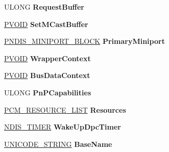 \begin{DoxyCompactItemize}
U\+L\+O\+NG {\bfseries Request\+Buffer}
\item 
\mbox{\label{struct___n_d_i_s___m_i_n_i_p_o_r_t___b_l_o_c_k_a7dcd0e1f355203dc4f05fac47b63d294}} 
\hyperlink{interfacevoid}{P\+V\+O\+ID} {\bfseries Set\+M\+Cast\+Buffer}
\item 
\mbox{\label{struct___n_d_i_s___m_i_n_i_p_o_r_t___b_l_o_c_k_a522afa69946a1b5e1d6725f5083ccd54}} 
\hyperlink{struct___n_d_i_s___m_i_n_i_p_o_r_t___b_l_o_c_k}{P\+N\+D\+I\+S\+\_\+\+M\+I\+N\+I\+P\+O\+R\+T\+\_\+\+B\+L\+O\+CK} {\bfseries Primary\+Miniport}
\item 
\mbox{\label{struct___n_d_i_s___m_i_n_i_p_o_r_t___b_l_o_c_k_a808a6ea9d3ea5e9e488815e2e726ae3a}} 
\hyperlink{interfacevoid}{P\+V\+O\+ID} {\bfseries Wrapper\+Context}
\item 
\mbox{\label{struct___n_d_i_s___m_i_n_i_p_o_r_t___b_l_o_c_k_ad74d6be767baf7432404ab32d6d273fb}} 
\hyperlink{interfacevoid}{P\+V\+O\+ID} {\bfseries Bus\+Data\+Context}
\item 
\mbox{\label{struct___n_d_i_s___m_i_n_i_p_o_r_t___b_l_o_c_k_afcb71db123d9d692d614f1b041b8a9e3}} 
U\+L\+O\+NG {\bfseries Pn\+P\+Capabilities}
\item 
\mbox{\label{struct___n_d_i_s___m_i_n_i_p_o_r_t___b_l_o_c_k_a035a1a9677912acbb448d1191024f8ea}} 
\hyperlink{struct___c_m___r_e_s_o_u_r_c_e___l_i_s_t}{P\+C\+M\+\_\+\+R\+E\+S\+O\+U\+R\+C\+E\+\_\+\+L\+I\+ST} {\bfseries Resources}
\item 
\mbox{\label{struct___n_d_i_s___m_i_n_i_p_o_r_t___b_l_o_c_k_af86f0e6cd44d3892eef7e03d8bef003a}} 
\hyperlink{struct___n_d_i_s___t_i_m_e_r}{N\+D\+I\+S\+\_\+\+T\+I\+M\+ER} {\bfseries Wake\+Up\+Dpc\+Timer}
\item 
\mbox{\label{struct___n_d_i_s___m_i_n_i_p_o_r_t___b_l_o_c_k_a1d051683167916b3aceccc5b7818f171}} 
\hyperlink{struct___u_n_i_c_o_d_e___s_t_r_i_n_g}{U\+N\+I\+C\+O\+D\+E\+\_\+\+S\+T\+R\+I\+NG} {\bfseries Base\+Name}

\end{DoxyCompactItemize}
